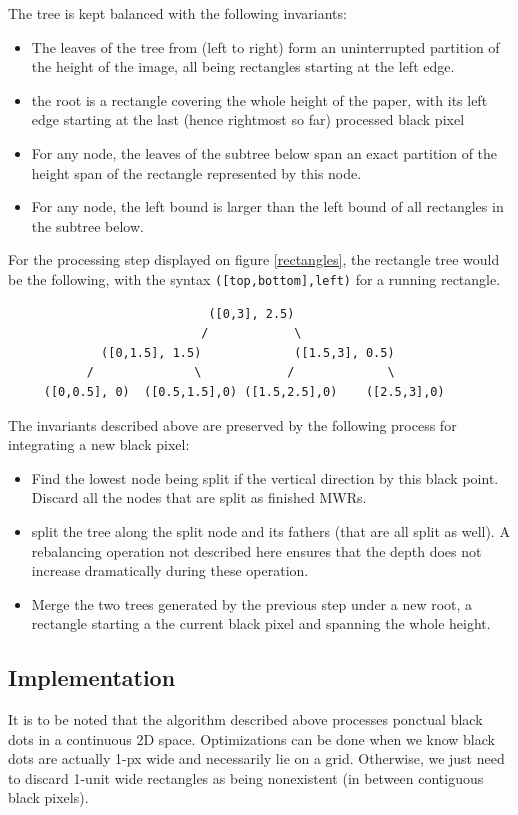 \documentclass{report}
\begin{document}
The tree is kept balanced with the following invariants:
\begin{itemize}
  \item The leaves of the tree from (left to right) form an uninterrupted partition of the height of the image, all being rectangles starting at
  the left edge.
  \item the root is a rectangle covering the whole height of the paper, with its left edge starting at the last (hence rightmost so far)
  processed black pixel
  \item For any node, the leaves of the subtree below span an exact partition of the height span of the rectangle represented by this node.
  \item For any node, the left bound is larger than the left bound of all rectangles in the subtree below.
\end{itemize}
For the processing step displayed on figure \ref{rectangles}, the rectangle tree would be the following, with the syntax
\verb+([top,bottom],left)+ for a running rectangle.\\

\begin{verbatim}
                            ([0,3], 2.5)
                           /            \
             ([0,1.5], 1.5)             ([1.5,3], 0.5)
           /              \            /             \
     ([0,0.5], 0)  ([0.5,1.5],0) ([1.5,2.5],0)    ([2.5,3],0)
\end{verbatim}

The invariants described above are preserved by the following process for integrating a new black pixel:
\begin{itemize}
  \item Find the lowest node being split if the vertical direction by this black point. Discard all the nodes that are split as finished MWRs.
  \item split the tree along the split node and its fathers (that are all split as well). A rebalancing operation not described here ensures that
  the depth does not increase dramatically during these operation.
  \item Merge the two trees generated by the previous step under a new root, a rectangle starting a the current black pixel and spanning the
  whole height.
\end{itemize}

\subsection{Implementation}
It is to be noted that the algorithm described above processes ponctual black dots in a continuous 2D space. Optimizations can be done when we
know black dots are actually 1-px wide and necessarily lie on a grid. Otherwise, we just need to discard 1-unit wide rectangles as being
nonexistent (in between contiguous black pixels).\\
\end{document}
